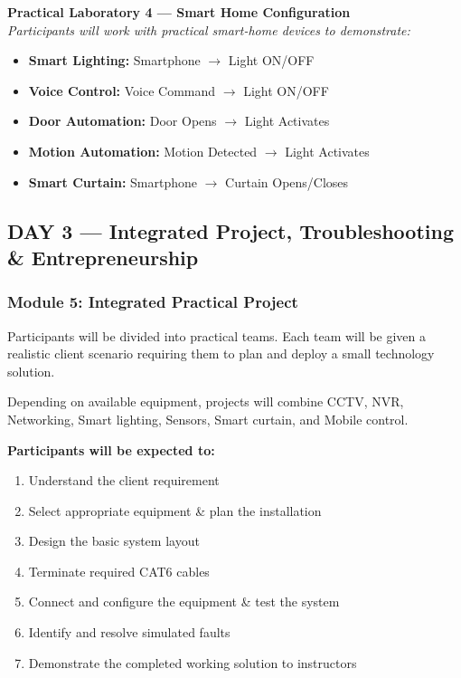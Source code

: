 \documentclass[11pt,a4paper]{article}
\begin{document}
\vspace{4pt}
\begin{tcolorbox}[calloutbox]
\textbf{Practical Laboratory 4 — Smart Home Configuration}\\
\textit{Participants will work with practical smart-home devices to demonstrate:}
\begin{itemize}
    \item \textbf{Smart Lighting:} Smartphone $\rightarrow$ Light ON/OFF
    \item \textbf{Voice Control:} Voice Command $\rightarrow$ Light ON/OFF
    \item \textbf{Door Automation:} Door Opens $\rightarrow$ Light Activates
    \item \textbf{Motion Automation:} Motion Detected $\rightarrow$ Light Activates
    \item \textbf{Smart Curtain:} Smartphone $\rightarrow$ Curtain Opens/Closes
\end{itemize}
\end{tcolorbox}

\subsection{DAY 3 — Integrated Project, Troubleshooting \& Entrepreneurship}

\subsubsection{Module 5: Integrated Practical Project}
Participants will be divided into practical teams. Each team will be given a realistic client scenario requiring them to plan and deploy a small technology solution.

Depending on available equipment, projects will combine CCTV, NVR, Networking, Smart lighting, Sensors, Smart curtain, and Mobile control.

\textbf{Participants will be expected to:}
\begin{enumerate}
    \item Understand the client requirement
    \item Select appropriate equipment & plan the installation
    \item Design the basic system layout
    \item Terminate required CAT6 cables
    \item Connect and configure the equipment & test the system
    \item Identify and resolve simulated faults
    \item Demonstrate the completed working solution to instructors
\end{enumerate}
\end{document}
